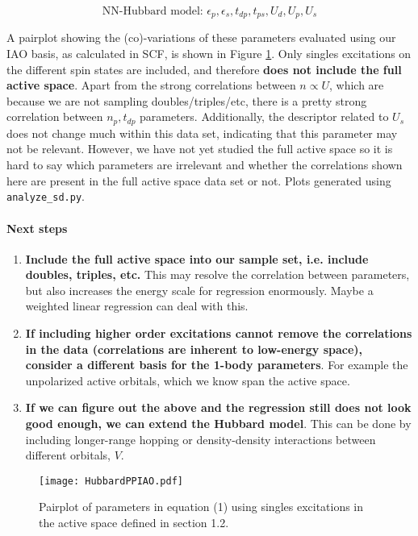 \documentclass{article}
\begin{document}
\begin{equation}
\boxed{\text{NN-Hubbard model: }\epsilon_{p}, \epsilon_{s}, t_{dp}, t_{ps}, U_d, U_p, U_s}
\end{equation}

A pairplot showing the (co)-variations of these parameters evaluated using our IAO basis, as calculated in SCF, is shown in Figure \ref{fig:HubbardPPIAO}. Only singles excitations on the different spin states are included, and therefore \textbf{does not include the full active space}. Apart from the strong correlations between $n \propto U$, which are because we are not sampling doubles/triples/etc, there is a pretty strong correlation between $n_p, t_{dp}$ parameters. Additionally, the descriptor related to $U_s$ does not change much within this data set, indicating that this parameter may not be relevant. However, we have not yet studied the full active space so it is hard to say which parameters are irrelevant and whether the correlations shown here are present in the full active space data set or not. Plots generated using \texttt{analyze\_sd.py}.

\pagebreak
\paragraph{Next steps}

\begin{enumerate}
\item \textbf{Include the full active space into our sample set, i.e. include doubles, triples, etc.} This may resolve the correlation between parameters, but also increases the energy scale for regression enormously. Maybe a weighted linear regression can deal with this.
\item \textbf{If including higher order excitations cannot remove the correlations in the data (correlations are inherent to low-energy space), consider a different basis for the 1-body parameters}. For example the unpolarized active orbitals, which we know span the active space.
\item \textbf{If we can figure out the above and the regression still does not look good enough, we can extend the Hubbard model}. This can be done by including longer-range hopping or density-density interactions between different orbitals, $V$. 
\end{enumerate}

\begin{figure}[H]
\centering
\texttt{[image: HubbardPPIAO.pdf]}
\caption{Pairplot of parameters in equation (1) using singles excitations in the active space defined in section 1.2.}
\label{fig:HubbardPPIAO}
\end{figure}
\end{document}
